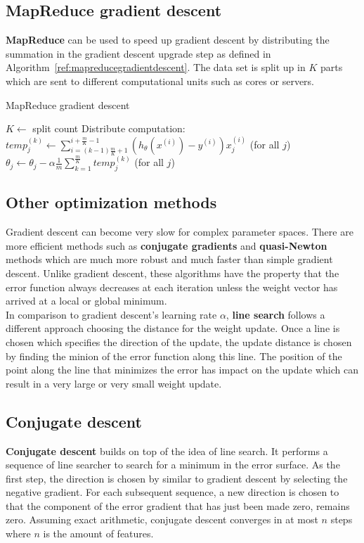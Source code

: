 \documentclass{report}
\begin{document}
\subsection{MapReduce gradient descent}
{\bf MapReduce} can be used to speed up gradient descent by distributing the summation in the gradient descent upgrade step as defined in Algorithm~\ref{ref:mapreducegradientdescent}. The data set is split up in $K$ parts which are sent to different computational units such as cores or servers.

\begin{algorithm}
\caption{MapReduce gradient descent}
\label{ref:mapreducegradientdescent}
\begin{algorithmic}
\State $K\gets $ split count
\Repeat
{}
\State Distribute computation: $temp_j^{(k)}\gets \sum_{i=(k-1)\frac{m}{K}+1}^{i+\frac{m}{K}-1}(h_\theta(x^{(i)})-y^{(i)})x_j^{(i)}$ (for all $j$)
\EndFor
\State $\theta_j  \gets \theta_j - \alpha \frac{1}{m}\sum_{k=1}^{\frac{m}{K}}temp_j^{(k)}$ (for all $j$)
\end{algorithmic}
\end{algorithm}

\subsection{Other optimization methods}
Gradient descent can become very slow for complex parameter spaces.
There are more efficient methods such as {\bf conjugate gradients} and {\bf quasi-Newton} methods which are much more robust and much faster than simple gradient descent.
Unlike gradient descent, these algorithms have the property that the error function always decreases at each iteration unless the weight vector has arrived at a local or global minimum. \\
In comparison to gradient descent's learning rate $\alpha$, {\bf line search} follows a different approach choosing the distance for the weight update.
Once a line is chosen which specifies the direction of the update, the update distance is chosen by finding the minion of the error function along this line.
The position of the point along the line that minimizes the error has impact on the update which can result in a very large or very small weight update.

\subsection{Conjugate descent}
{\bf Conjugate descent} builds on top of the idea of line search. It performs a sequence of line searcher to search for a minimum in the error surface.
As the first step, the direction is chosen by similar to gradient descent by selecting the negative gradient.
For each subsequent sequence, a new direction is chosen to that the component of the error gradient that has just been made zero, remains zero.
Assuming exact arithmetic, conjugate descent converges in at most $n$ steps where $n$ is the amount of features.
\end{document}
